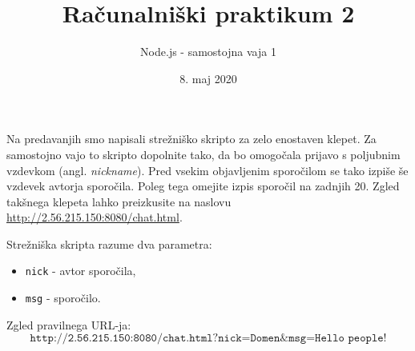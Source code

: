 \documentclass[a4paper,10pt]{article}
\title{Računalniški praktikum 2}
\author{Node.js - samostojna vaja 1}
\date{8. maj 2020}
\begin{document}
\maketitle

\noindent
Na predavanjih smo napisali strežniško skripto za zelo enostaven klepet. Za samostojno vajo to skripto dopolnite tako, da bo omogočala prijavo s poljubnim vzdevkom (angl. \emph{nickname}). Pred vsekim objavljenim sporočilom se tako izpiše še vzdevek avtorja sporočila. Poleg tega omejite izpis sporočil na zadnjih 20. Zgled takšnega klepeta lahko preizkusite na naslovu \url{http://2.56.215.150:8080/chat.html}.

\medskip\noindent
Strežniška skripta razume dva parametra:
\begin{itemize}[noitemsep]
\item \texttt{nick} - avtor sporočila,
\item \texttt{msg} - sporočilo.
\end{itemize}
Zgled pravilnega URL-ja:
$$
\texttt{http://2.56.215.150:8080/chat.html?nick=Domen\&msg=Hello people!}
$$
\end{document}
